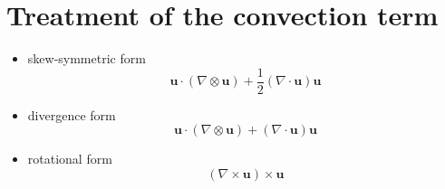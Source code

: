 \documentclass[]{scrartcl}
\begin{document}
\section{Treatment of the convection term}

\begin{itemize}
	\item skew-symmetric form
	\begin{equation*}
		\mathbf{u} \cdot (\nabla \otimes \mathbf{u}) + \dfrac{1}{2} (\nabla \cdot \mathbf{u})\mathbf{u}
	\end{equation*}
	\item divergence form
	\begin{equation*}
		\mathbf{u} \cdot (\nabla \otimes \mathbf{u}) + (\nabla \cdot \mathbf{u})\mathbf{u}
	\end{equation*}
	\item rotational form
	\begin{equation*}
		(\nabla \times \mathbf{u}) \times \mathbf{u}
	\end{equation*}
\end{itemize}
\end{document}

